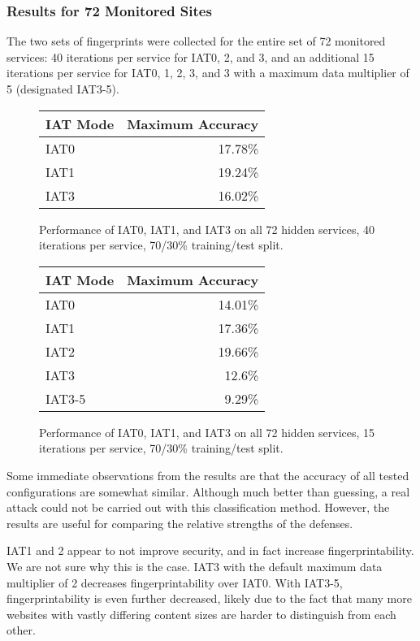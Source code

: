 \documentclass[11pt]{article}
\begin{document}
\subsubsection{Results for 72 Monitored Sites}
The two sets of fingerprints were collected for the entire set of 72 monitored services: 40 iterations per service for IAT0, 2, and 3, and an additional 15 iterations per service for IAT0, 1, 2, 3, and 3 with a maximum data multiplier of 5 (designated IAT3-5).

\begin{figure}[h]
    \centering
    \begin{tabular}{|l|r|}
        \hline
        IAT Mode & Maximum Accuracy \\
        \hline
        IAT0 & 17.78\%\\
        IAT1 & 19.24\% \\
        IAT3 & 16.02\%\\
        \hline
    \end{tabular}
    \caption[]{Performance of IAT0, IAT1, and IAT3 on all 72 hidden services, 40 iterations per service, 70/30\% training/test split.}
\end{figure}
\begin{figure}[h]
    \centering
    \begin{tabular}{|l|r|}
        \hline
        IAT Mode & Maximum Accuracy \\
        \hline
        IAT0 & 14.01\% \\
        IAT1 & 17.36\% \\
        IAT2 & 19.66\%\\
        IAT3 & 12.6\%\\
        IAT3-5 & 9.29\%\\
        \hline
    \end{tabular}
    \caption[]{Performance of IAT0, IAT1, and IAT3 on all 72 hidden services, 15 iterations per service, 70/30\% training/test split.}
\end{figure}

Some immediate observations from the results are that the accuracy of all tested configurations are somewhat similar. Although much better than guessing, a real attack could not be carried out with this classification method. However, the results are useful for comparing the relative strengths of the defenses.

IAT1 and 2 appear to not improve security, and in fact increase fingerprintability. We are not sure why this is the case. IAT3 with the default maximum data multiplier of 2 decreases fingerprintability over IAT0. With IAT3-5, fingerprintability is even further decreased, likely due to the fact that many more websites with vastly differing content sizes are harder to distinguish from each other.
\end{document}
